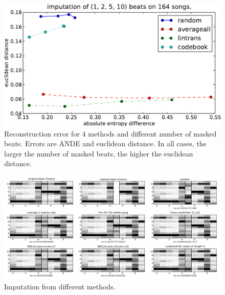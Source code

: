 \documentclass{article}
\begin{document}
\begin{figure}[t]
\begin{center}
\includegraphics[width=.9\columnwidth]{recon_score_in_2d}
\end{center}
\caption{Reconstruction error for $4$ methods and different
number of masked beats. Errors are ANDE and euclidean
distance. In all cases, the larger the number of masked beats,
the higher the euclidean distance.}
\label{fig:2dscore}
\end{figure}

\begin{figure}[t]
\begin{center}
\includegraphics[width=.9\columnwidth]{imputation}
\end{center}
\caption{Imputation from different methods.}
\label{fig:imputation}
\end{figure}
\end{document}
